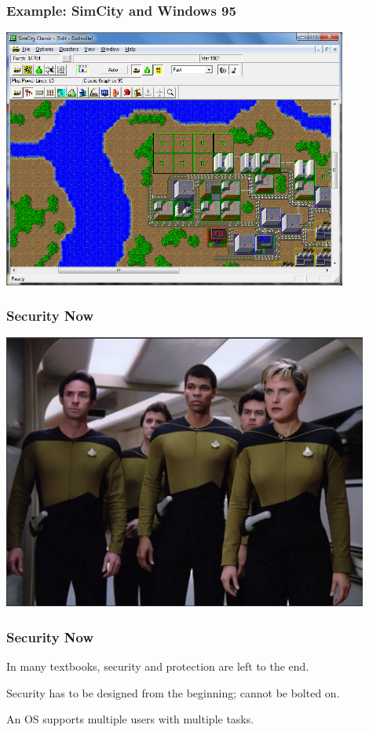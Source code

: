 \begin{frame}
\frametitle{Example: SimCity and Windows 95}

\begin{center}
	\includegraphics[width=0.85\textwidth]{images/simcity.png}
\end{center}

\end{frame}



\begin{frame}
\frametitle{Security Now}

\begin{center}
	\includegraphics[width=0.9\textwidth]{images/security-team.png}
\end{center}


\end{frame}


\begin{frame}
\frametitle{Security Now}

In many textbooks, security and protection are left to the end.

Security has to be designed from the beginning; cannot be bolted on.

An OS supports multiple users with multiple tasks.

\end{frame}


